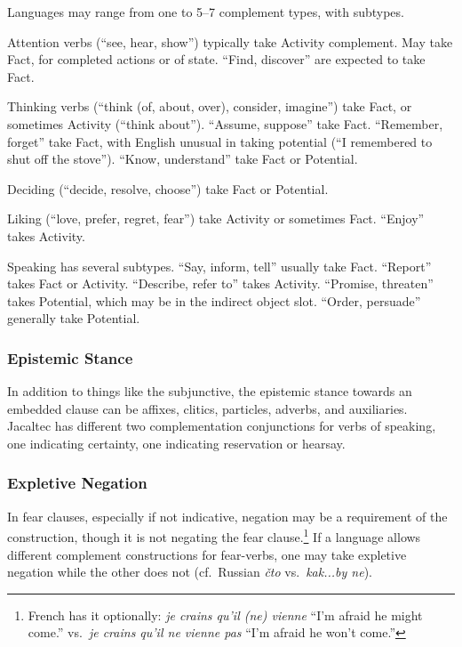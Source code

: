 \documentclass[11pt]{article}
\newcommand{\E}[1]{\textit{#1}}   %
\begin{document}
{Languages may range from one to 5--7 complement types, with subtypes.

Attention verbs (``see, hear, show'') typically take Activity
complement.  May take Fact, for completed actions or of state.
``Find, discover'' are expected to take Fact.

Thinking verbs (``think (of, about, over), consider, imagine'') take
Fact, or sometimes Activity (``think about'').  ``Assume, suppose''
take Fact.  ``Remember, forget'' take Fact, with English unusual in
taking potential (``I remembered to shut off the stove'').  ``Know,
understand'' take Fact or Potential.

Deciding (``decide, resolve, choose'') take Fact or Potential.

Liking (``love, prefer, regret, fear'') take Activity or sometimes
Fact.  ``Enjoy'' takes Activity.

Speaking has several subtypes.  ``Say, inform, tell'' usually take
Fact.  ``Report'' takes Fact or Activity.  ``Describe, refer to''
takes Activity.  ``Promise, threaten'' takes Potential, which may be
in the indirect object slot.  ``Order, persuade'' generally take
Potential. 

\subsubsection{Epistemic Stance}
In addition to things like the subjunctive, the epistemic stance
towards an embedded clause can be affixes, clitics, particles,
adverbs, and auxiliaries.  Jacaltec has different two complementation
conjunctions for verbs of speaking, one indicating certainty, one
indicating reservation or hearsay.

\subsubsection{Expletive Negation}
In fear clauses, especially if not indicative, negation may be a
requirement of the construction, though it is not negating the fear
clause.\footnote{French has it optionally: \E{je crains qu'il (ne)
    vienne} ``I'm afraid he might come.'' vs.\ \E{je crains qu'il ne
    vienne pas} ``I'm afraid he won't come.''}  If a language allows
different complement constructions for fear-verbs, one may take
expletive negation while the other does not (cf.\ Russian \E{čto}
vs.\ \E{kak...by ne}).

}
\end{document}
